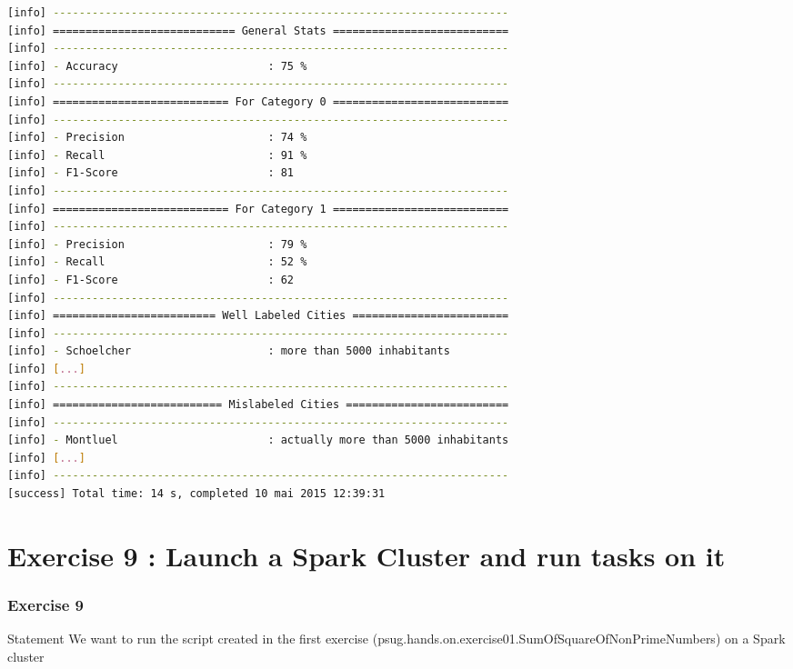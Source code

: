 \documentclass[slidetop,9pt,utf8]{beamer}
\begin{document}
\begin{CJK}{UTF8}{gbsn}
\begin{frame}[fragile]
    \begin{lstlisting}[language=bash, style=terminal]
[info] ----------------------------------------------------------------------
[info] ============================ General Stats ===========================
[info] ----------------------------------------------------------------------
[info] - Accuracy                       : 75 %
[info] ----------------------------------------------------------------------
[info] =========================== For Category 0 ===========================
[info] ----------------------------------------------------------------------
[info] - Precision                      : 74 %
[info] - Recall                         : 91 %
[info] - F1-Score                       : 81
[info] ----------------------------------------------------------------------
[info] =========================== For Category 1 ===========================
[info] ----------------------------------------------------------------------
[info] - Precision                      : 79 %
[info] - Recall                         : 52 %
[info] - F1-Score                       : 62
[info] ----------------------------------------------------------------------
[info] ========================= Well Labeled Cities ========================
[info] ----------------------------------------------------------------------
[info] - Schoelcher                     : more than 5000 inhabitants
[info] [...]
[info] ----------------------------------------------------------------------
[info] ========================== Mislabeled Cities =========================
[info] ----------------------------------------------------------------------
[info] - Montluel                       : actually more than 5000 inhabitants
[info] [...]
[info] ----------------------------------------------------------------------
[success] Total time: 14 s, completed 10 mai 2015 12:39:31
    \end{lstlisting}

\end{frame}

\section{Exercise 9 : Launch a Spark Cluster and run tasks on it}

\begin{frame}
  \frametitle{Exercise 9}

  \begin{block}{Statement}
    We want to run the script created in the first exercise (psug.hands.on.exercise01.SumOfSquareOfNonPrimeNumbers) on a 
Spark cluster
  \end{block}


\end{frame}
\end{CJK}
\end{document}
